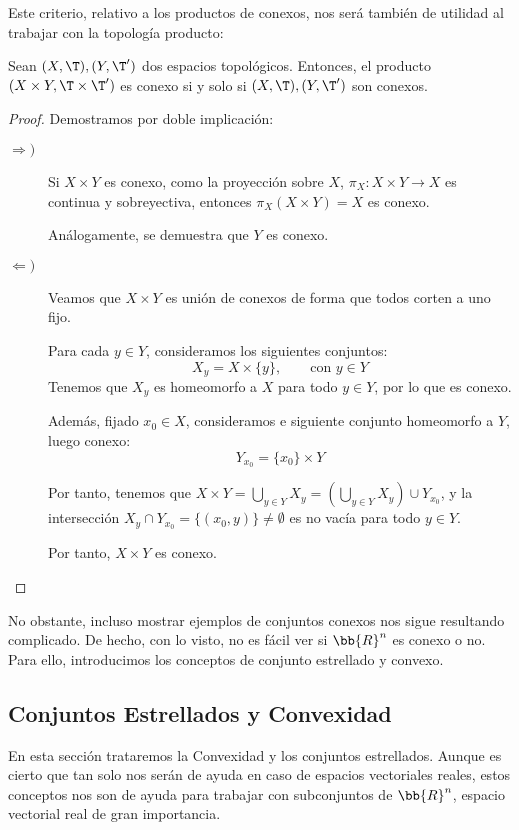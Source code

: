 Este criterio, relativo a los productos de conexos, nos será también de utilidad al trabajar con la topología producto:
\begin{prop}
    Sean $(X,\T), (Y,\T')$ dos espacios topológicos. Entonces, el producto $(X\times Y, \T\times \T')$ es conexo si y solo si $(X,\T), (Y,\T')$ son conexos.
\end{prop}
\begin{proof}
    Demostramos por doble implicación:
    \begin{description}
        \item[$\Longrightarrow)$]
        Si $X\times Y$ es conexo, como la proyección sobre $X$, $\pi_X:X\times Y\to X$ es continua y sobreyectiva, entonces $\pi_X(X\times Y)=X$ es conexo.

        Análogamente, se demuestra que $Y$ es conexo.

        \item[$\Longleftarrow)$] Veamos que $X\times Y$ es unión de conexos de forma que todos corten a uno fijo.

        Para cada $y\in Y$, consideramos los siguientes conjuntos:
        \begin{equation*}
            X_y = X\times \{y\},\qquad \text{con } y\in Y
        \end{equation*}
        Tenemos que $X_y$ es homeomorfo a $X$ para todo $y\in Y$, por lo que es conexo.

        Además, fijado $x_0\in X$, consideramos e siguiente conjunto homeomorfo a $Y$, luego conexo:
        \begin{equation*}
            Y_{x_0} = \{x_0\}\times Y
        \end{equation*}

        Por tanto, tenemos que $X\times Y = \bigcup\limits_{y\in Y}X_y = \left(\bigcup\limits_{y\in Y}X_y\right) \cup Y_{x_0}$, y la intersección $X_y\cap Y_{x_0}=\{(x_0,y)\}\neq \emptyset$ es no vacía para todo $y\in Y$.

        Por tanto, $X\times Y$ es conexo.
    \end{description}
\end{proof}

No obstante, incluso mostrar ejemplos de conjuntos conexos nos sigue resultando complicado. De hecho, con lo visto, no es fácil ver si $\bb{R}^n$ es conexo o no.
Para ello, introducimos los conceptos de conjunto estrellado y convexo.
\subsection{Conjuntos Estrellados y Convexidad}
En esta sección trataremos la Convexidad y los conjuntos estrellados. Aunque es cierto que tan solo nos serán de ayuda en caso de
espacios vectoriales reales, estos conceptos nos son de ayuda para trabajar con subconjuntos de $\bb{R}^n$, espacio vectorial real de gran importancia.

